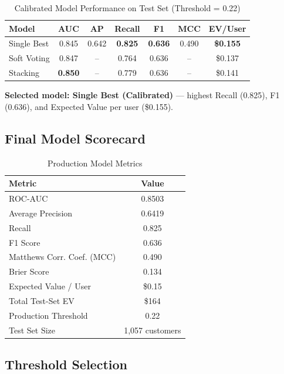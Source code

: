 \documentclass[conference]{IEEEtran}
\begin{document}
\begin{table}[h]
\centering
\caption{Calibrated Model Performance on Test Set (Threshold = 0.22)}
\begin{tabular}{lcccccc}
\toprule
\textbf{Model} & \textbf{AUC} & \textbf{AP} & \textbf{Recall} & \textbf{F1} & \textbf{MCC} & \textbf{EV/User} \\
\midrule
Single Best & 0.845 & 0.642 & \textbf{0.825} & \textbf{0.636} & 0.490 & \textbf{\$0.155} \\
Soft Voting & 0.847 & -- & 0.764 & 0.636 & -- & \$0.137 \\
Stacking & \textbf{0.850} & -- & 0.779 & 0.636 & -- & \$0.141 \\
\bottomrule
\end{tabular}
\end{table}

\textbf{Selected model: Single Best (Calibrated)} --- highest Recall (0.825), F1 (0.636), and Expected Value per user (\$0.155).

\subsection{Final Model Scorecard}

\begin{table}[h]
\centering
\caption{Production Model Metrics}
\begin{tabular}{lc}
\toprule
\textbf{Metric} & \textbf{Value} \\
\midrule
ROC-AUC & 0.8503 \\
Average Precision & 0.6419 \\
Recall & 0.825 \\
F1 Score & 0.636 \\
Matthews Corr. Coef. (MCC) & 0.490 \\
Brier Score & 0.134 \\
Expected Value / User & \$0.15 \\
Total Test-Set EV & \$164 \\
Production Threshold & 0.22 \\
Test Set Size & 1,057 customers \\
\bottomrule
\end{tabular}
\end{table}

\subsection{Threshold Selection}
\end{document}
